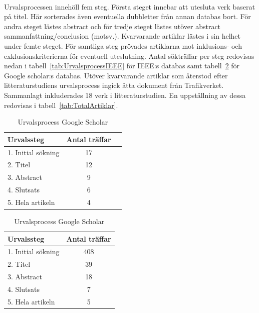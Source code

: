 \paragraph{}
\hspace{-11pt}Urvalsprocessen innehöll fem steg.
Första steget innebar att utesluta verk baserat på titel.
Här sorterades även eventuella dubbletter från annan databas bort.
För andra steget lästes abstract och för tredje steget lästes utöver abstract sammanfattning/conclusion (motsv.).
Kvarvarande artiklar lästes i sin helhet under femte steget.
För samtliga steg prövades artiklarna mot inklusions- och exklusionskriterierna för eventuell uteslutning.
Antal sökträffar per steg redovisas nedan i tabell~\ref{tab:UrvalsprocessIEEE} för IEEE:s databas samt tabell~\ref{tab:UrvalsprocessGoogleScholar} för Google scholar:s databas.
Utöver kvarvarande artiklar som återstod efter litteraturstudiens urvalsprocess ingick åtta dokument från Trafikverket.
Sammanlagt inkluderades 18 verk i litteraturstudien.
En uppställning av dessa redovisas i tabell~\ref{tab:TotalArtiklar}.
\begin{table}[h]
    \centering
    \begin{minipage}{0.45\textwidth}
        \centering
        \begin{tabular}{|l|c|c|}
            \hline
            Urvalssteg & Antal träffar \\
            \hline
            1. Initial sökning & 17 \\
            2. Titel & 12 \\
            3. Abstract & 9 \\
            4. Slutsats & 6 \\
            5. Hela artikeln & 4 \\
            \hline
        \end{tabular}
        \caption{Urvalsprocess IEEE}
        \label{tab:UrvalsprocessIEEE}
    \end{minipage}%
    \hfill
    \begin{minipage}{0.45\textwidth}
        \centering
        \begin{tabular}{|l|c|}
            \hline
            Urvalssteg & Antal träffar \\
            \hline
            1. Initial sökning & 408 \\
            2. Titel & 39 \\
            3. Abstract & 18 \\
            4. Slutsats & 7 \\
            5. Hela artikeln & 5 \\
            \hline
        \end{tabular}
        \caption{Urvalsprocess Google Scholar}
        \label{tab:UrvalsprocessGoogleScholar}
    \end{minipage}
\end{table}

